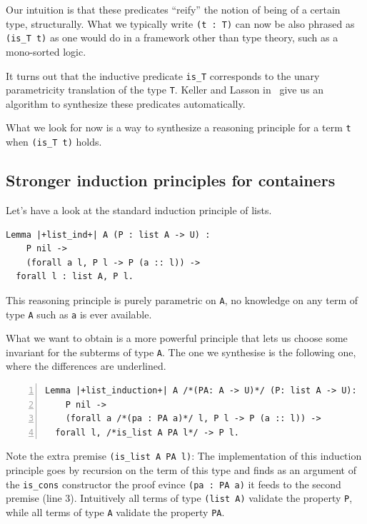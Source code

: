 \documentclass[sigplan,10pt,review]{acmart}\settopmatter{printfolios=true,printccs=false,printacmref=false}
\begin{document}
Our intuition is that these predicates ``reify'' the notion of being
of a certain type, structurally. What we typically write \lstinline+(t : T)+
can now be also phrased as \lstinline+(is_T t)+ as one would do in a
framework other than type theory, such as a mono-sorted logic.

It turns out that the inductive predicate \lstinline+is_T+ corresponds
to the unary parametricity translation of the type \lstinline+T+.
Keller and Lasson in~\cite{keller:hal-00730913} give us an
algorithm to synthesize these predicates automatically.

What we look for now is a way to synthesize
a reasoning principle for a term \lstinline+t+ when 
\lstinline+(is_T t)+ holds.

\subsection{Stronger induction principles for containers} %

Let's have a look at the standard induction principle of lists.

\begin{minipage}{\textwidth}\begin{lstlisting}
Lemma |+list_ind+| A (P : list A -> U) :
    P nil ->
    (forall a l, P l -> P (a :: l)) ->
  forall l : list A, P l.
\end{lstlisting}\end{minipage}

\noindent
This reasoning principle is purely parametric on \lstinline+A+, no
knowledge on any term of type \lstinline+A+ such as \lstinline+a+ is
ever available.

What we want to obtain is a more powerful principle that lets us choose
some invariant for the subterms of type \lstinline+A+. The one we
synthesise is the following one, where the differences are underlined.

\begin{minipage}{\textwidth}\begin{lstlisting}[numbers=left]
Lemma |+list_induction+| A /*(PA: A -> U)*/ (P: list A -> U):
    P nil ->
    (forall a /*(pa : PA a)*/ l, P l -> P (a :: l)) ->
  forall l, /*is_list A PA l*/ -> P l.
\end{lstlisting}\end{minipage}

\noindent
Note the extra premise \lstinline+(is_list A PA l)+: The
implementation of this induction principle
goes by recursion on the term of this type and finds
as an argument of the \lstinline+is_cons+ constructor
the proof evince \lstinline+(pa : PA a)+ it feeds to the second premise
(line 3). Intuitively all terms of type \lstinline+(list A)+
validate the property \lstinline+P+, while all terms of type
\lstinline+A+ validate the property \lstinline+PA+.
\end{document}
